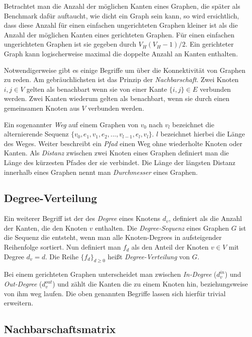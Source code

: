 \documentclass[a4paper,ngerman,oneside,titlepage,bibliography=totoc,11pt]{scrreprt}
\begin{document}
Betrachtet man die Anzahl der möglichen Kanten eines Graphen, die später als Benchmark dafür auftaucht, wie dicht ein Graph sein kann, so wird ersichtlich, dass diese Anzahl für einen einfachen ungerichteten Graphen kleiner ist als die Anzahl der möglichen Kanten eines gerichteten Graphen. Für einen einfachen ungerichteten Graphen ist sie gegeben durch $V_H(V_H-1)/2$. Ein gerichteter Graph kann logischerweise maximal die doppelte Anzahl an Kanten enthalten.

Notwendigerweise gibt es einige Begriffe um über die Konnektivität von Graphen zu reden. Am gebräuchlichsten ist das Prinzip der \emph{Nachbarschaft}. Zwei Knoten $ i,j \in V$ gelten als benachbart wenn sie von einer Kante $\{i,j\} \in E$ verbunden werden. Zwei Kanten wiederum gelten als benachbart, wenn sie durch einen gemeinsamen Knoten aus $V$ verbunden werden.

Ein sogenannter \emph{Weg} auf einem Graphen von $v_0$ nach $v_l$ bezeichnet die alternierende Sequenz $\{v_0, e_1, v_1, e_2, ..., v_{l-1}, e_l, v_l\}$. $l$ bezeichnet hierbei die Länge des Weges. Weiter beschreibt ein \emph{Pfad} einen Weg ohne wiederholte Knoten oder Kanten. Als \emph{Distanz} zwischen zwei Knoten eines Graphen definiert man die Länge des kürzesten Pfades der sie verbindet. Die Länge der längsten Distanz innerhalb eines Graphen nennt man \emph{Durchmesser} eines Graphen.

\subsection{Degree-Verteilung}
Ein weiterer Begriff ist der des \emph{Degree} eines Knotens $d_v$, definiert als die Anzahl der Kanten, die den Knoten $v$ enthalten. Die \emph{Degree-Sequenz} eines Graphen $G$ ist die Sequenz die entsteht, wenn man alle Knoten-Degrees in aufsteigender Reihenfolge sortiert. Nun definiert man $f_d$ als den Anteil der Knoten $v \in V$ mit Degree $d_v = d$. Die Reihe $\{f_d\}_{d \geq 0}$ heißt \emph{Degree-Verteilung} von $G$. 

Bei einem gerichteten Graphen unterscheidet man zwischen \emph{In-Degree} ($d_v^{in}$) und \emph{Out-Degree} ($d_v^{out}$) und zählt die Kanten die zu einem Knoten hin, beziehungsweise von ihm weg laufen. Die oben genannten Begriffe lassen sich hierfür trivial erweitern.

\subsection{Nachbarschaftsmatrix}
\end{document}

